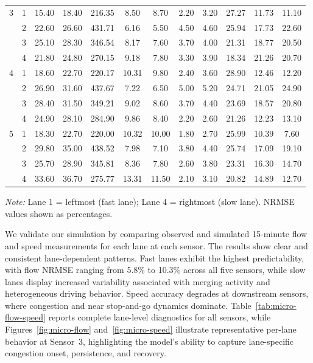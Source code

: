 \documentclass{scspaperproc}
\theoremstyle{scsthe}
\begin{document}
\begin{table}[htbp]
\begin{tabular}{cc|ccccc|ccccc}
        \hline
        3 & 1 & 15.40 & 18.40 & 216.35 & 8.50 & 8.70 & 2.20 & 3.20 & 27.27 & 11.73 & 11.10 \\
          & 2 & 22.60 & 26.60 & 431.71 & 6.16 & 5.50 & 4.50 & 4.60 & 25.94 & 17.73 & 22.60 \\
          & 3 & 25.10 & 28.30 & 346.54 & 8.17 & 7.60 & 3.70 & 4.00 & 21.31 & 18.77 & 20.50 \\
          & 4 & 21.80 & 24.80 & 270.15 & 9.18 & 7.80 & 3.30 & 3.90 & 18.34 & 21.26 & 20.70 \\
        \hline
        4 & 1 & 18.60 & 22.70 & 220.17 & 10.31 & 9.80 & 2.40 & 3.60 & 28.90 & 12.46 & 12.20 \\
          & 2 & 26.90 & 31.60 & 437.67 & 7.22 & 6.50 & 5.00 & 5.20 & 24.71 & 21.05 & 24.90 \\
          & 3 & 28.40 & 31.50 & 349.21 & 9.02 & 8.60 & 3.70 & 4.40 & 23.69 & 18.57 & 20.80 \\
          & 4 & 24.90 & 28.10 & 284.90 & 9.86 & 8.40 & 2.20 & 2.60 & 21.26 & 12.23 & 13.10 \\
        \hline
        5 & 1 & 18.30 & 22.70 & 220.00 & 10.32 & 10.00 & 1.80 & 2.70 & 25.99 & 10.39 & 7.60 \\
          & 2 & 29.80 & 35.00 & 438.52 & 7.98 & 7.10 & 3.80 & 4.40 & 25.74 & 17.09 & 19.10 \\
          & 3 & 25.70 & 28.90 & 345.81 & 8.36 & 7.80 & 2.60 & 3.80 & 23.31 & 16.30 & 14.70 \\
          & 4 & 33.60 & 36.70 & 275.77 & 13.31 & 11.50 & 2.10 & 3.10 & 20.82 & 14.89 & 12.70 \\
        \hline
    \end{tabular}
      \vspace{0.5em}
    \begin{flushleft}
        \footnotesize
        \textit{Note:} Lane 1 = leftmost (fast lane); Lane 4 = rightmost (slow lane). NRMSE values shown as percentages.
    \end{flushleft}
\end{table}

We validate our simulation by comparing observed and simulated 15-minute flow and speed measurements for each lane at each sensor. The results show clear and consistent lane-dependent patterns. Fast lanes exhibit the highest predictability, with flow NRMSE ranging from 5.8\% to 10.3\% across all five sensors, while slow lanes display increased variability associated with merging activity and heterogeneous driving behavior. Speed accuracy degrades at downstream sensors, where congestion and near stop-and-go dynamics dominate.
Table~\ref{tab:micro-flow-speed} reports complete lane-level diagnostics for all sensors, while Figures~\ref{fig:micro-flow} and~\ref{fig:micro-speed} illustrate representative per-lane behavior at Sensor~3, highlighting the model's ability to capture lane-specific congestion onset, persistence, and recovery.
\end{document}
